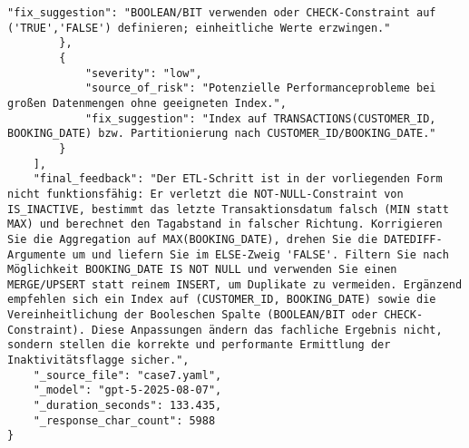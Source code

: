\begin{lstlisting}[caption={Ausgabe: GPT-5 Anwendungsfall 7 Robustheitsdurchlauf},label={gpt_case7_prompt3}]
            "fix_suggestion": "BOOLEAN/BIT verwenden oder CHECK-Constraint auf ('TRUE','FALSE') definieren; einheitliche Werte erzwingen."
        },
        {
            "severity": "low",
            "source_of_risk": "Potenzielle Performanceprobleme bei großen Datenmengen ohne geeigneten Index.",
            "fix_suggestion": "Index auf TRANSACTIONS(CUSTOMER_ID, BOOKING_DATE) bzw. Partitionierung nach CUSTOMER_ID/BOOKING_DATE."
        }
    ],
    "final_feedback": "Der ETL-Schritt ist in der vorliegenden Form nicht funktionsfähig: Er verletzt die NOT-NULL-Constraint von IS_INACTIVE, bestimmt das letzte Transaktionsdatum falsch (MIN statt MAX) und berechnet den Tagabstand in falscher Richtung. Korrigieren Sie die Aggregation auf MAX(BOOKING_DATE), drehen Sie die DATEDIFF-Argumente um und liefern Sie im ELSE-Zweig 'FALSE'. Filtern Sie nach Möglichkeit BOOKING_DATE IS NOT NULL und verwenden Sie einen MERGE/UPSERT statt reinem INSERT, um Duplikate zu vermeiden. Ergänzend empfehlen sich ein Index auf (CUSTOMER_ID, BOOKING_DATE) sowie die Vereinheitlichung der Booleschen Spalte (BOOLEAN/BIT oder CHECK-Constraint). Diese Anpassungen ändern das fachliche Ergebnis nicht, sondern stellen die korrekte und performante Ermittlung der Inaktivitätsflagge sicher.",
    "_source_file": "case7.yaml",
    "_model": "gpt-5-2025-08-07",
    "_duration_seconds": 133.435,
    "_response_char_count": 5988
}
\end{lstlisting}

